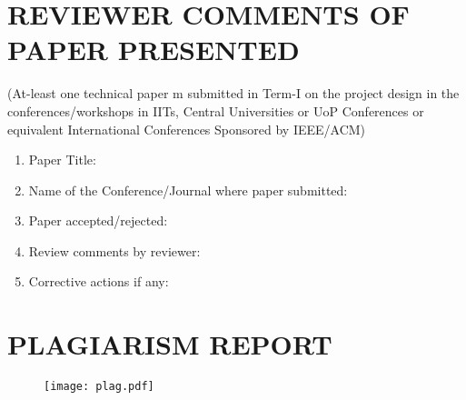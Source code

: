 \begin{appendices}
	\chapter[Reviewer comments of paper presented]{REVIEWER COMMENTS OF PAPER PRESENTED}
		(At-least one technical paper m submitted in Term-I on the project design in the conferences/workshops in IITs, Central Universities or UoP Conferences or equivalent International Conferences Sponsored by IEEE/ACM)

		\begin{enumerate}
			\item Paper Title:
			\vspace{1cm}
			\item Name of the Conference/Journal where paper submitted:
			\vspace{1cm}
			\item Paper accepted/rejected: 
			\vspace{1cm}
			\item Review comments by reviewer:
			\vspace{1cm}
			\item Corrective actions if any:
		\end{enumerate}
	
	\chapter[Plagiarism Report]{PLAGIARISM REPORT}
    \begin{figure}[h!]
        \centering
        \texttt{[image: plag.pdf]}
    \end{figure}
\end{appendices}